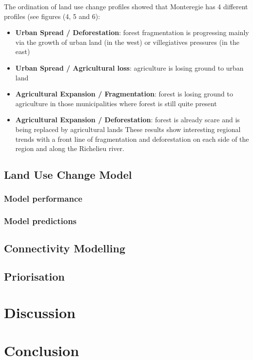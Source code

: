 The ordination of land use change profiles showed that Monteregie has 4 different profiles (see figures (4,  5 and 6):
\begin{itemize}
  \item \textbf{Urban Spread / Deforestation}: forest fragmentation is progressing mainly via the growth of urban land (in the west) or villegiatives pressures (in the east)
  \item \textbf{Urban Spread / Agricultural loss}: agriculture is losing ground to urban land
  \item \textbf{Agricultural Expansion / Fragmentation}: forest is losing ground to agriculture in those municipalities where forest is still quite present
  \item \textbf{Agricultural Expansion / Deforestation}: forest is already scare and is being replaced by agricultural lands
These results show interesting regional trends with a front line of fragmentation and deforestation on each side of the region and along the Richelieu river. \\ %
\end{itemize}

\subsection{Land Use Change Model}

\subsubsection{Model performance}

\subsubsection{Model predictions}

\subsection{Connectivity Modelling}

\subsection{Priorisation}

\section{Discussion}

\section{Conclusion}

